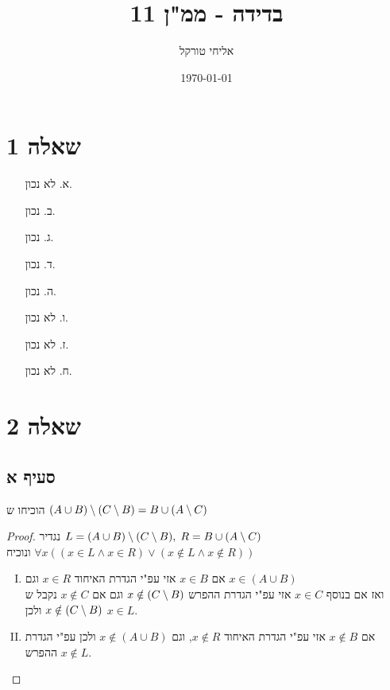 \documentclass{article}
\title{בדידה - ממ"ן 11}
\author{אליחי טורקל \ID}
\date\today
\begin{document}
	\maketitle %

	\section*{שאלה 1}


	\begin{itemize}
		\item[א.]לא נכון.
		\item[ב.]  נכון.
		\item[ג.] נכון.
		\item[ד.]נכון.
		\item[ה.]נכון.
		\item[ו.]לא נכון.
		\item[ז.]לא נכון.
		\item[ח.]לא נכון.
	\end{itemize}

	\pagebreak
	\section*{שאלה 2}
	\subsection*{סעיף א}
	הוכיחו ש $(A \cup B) \setminus (C \setminus B) = B \cup (A \setminus C)$
	\begin{proof}
		נגדיר
		$L = (A \cup B) \setminus (C \setminus B), \thickspace R = B \cup (A \setminus C)$ \\
		ונוכיח $\forall x((x \in L \land x \in R) \lor (x \notin L \land x \notin R))$
		\begin{enumerate}[(I)]
			\item אם $x \in B$ אזי עפ"י הגדרת האיחוד $x \in R$
			וגם $x \in (A \cup B)$ \\
			ואז אם בנוסף $x \in C$ אזי עפ"י הגדרת ההפרש $x \notin (C \setminus B)$
			וגם אם $x \notin C$ נקבל ש $x \notin (C \setminus B)$
			ולכן $x \in L$.
			\item אם $x \notin B$ אזי עפ"י הגדרת האיחוד $x \notin R$, וגם $x \notin (A \cup B)$
ולכן עפ"י הגדרת ההפרש $x \notin L$.
		\end{enumerate}
	\end{proof}
\end{document}

